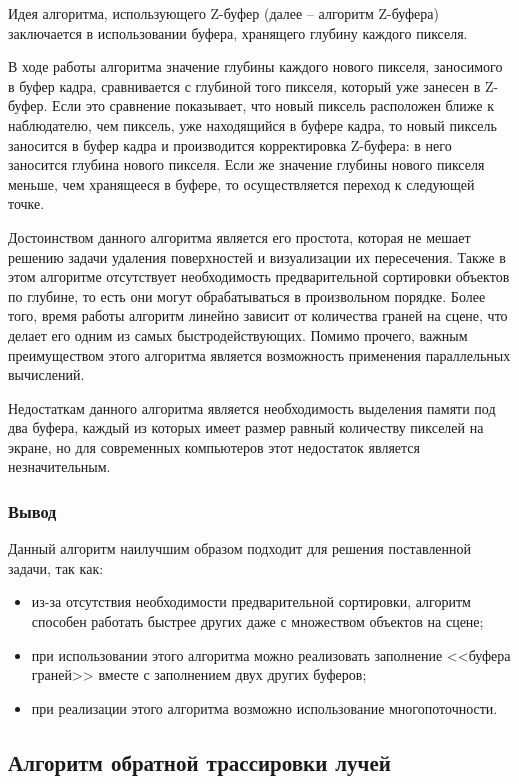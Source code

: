Идея алгоритма, использующего Z-буфер (далее -- алгоритм Z-буфера) заключается в использовании буфера, хранящего глубину каждого пикселя.

В ходе работы алгоритма значение глубины каждого нового пикселя, заносимого в буфер кадра, сравнивается с глубиной того пикселя, который уже занесен в Z-буфер. Если это сравнение показывает, что новый пиксель расположен ближе к наблюдателю, чем пиксель, уже находящийся в буфере кадра, то новый пиксель заносится в буфер кадра и производится корректировка Z-буфера: в него заносится глубина нового пикселя. Если же значение глубины нового пикселя меньше, чем хранящееся в буфере, то осуществляется переход к следующей точке.

Достоинством данного алгоритма является его простота, которая не мешает решению задачи удаления поверхностей и визуализации их пересечения. Также в этом алгоритме отсутствует необходимость предварительной сортировки объектов по глубине, то есть они могут обрабатываться в произвольном порядке. Более того, время работы алгоритм линейно зависит от количества граней на сцене, что делает его одним из самых быстродействующих. Помимо прочего, важным преимуществом этого алгоритма является возможность применения параллельных вычислений.

Недостаткам данного алгоритма является необходимость выделения памяти под два буфера, каждый из которых имеет размер равный количеству пикселей на экране, но для современных компьютеров этот недостаток является незначительным.

\subsubsection*{Вывод}

Данный алгоритм наилучшим образом подходит для решения поставленной задачи, так как:

\begin{itemize}[label=---]
	\item из-за отсутствия необходимости предварительной сортировки, алгоритм способен работать быстрее других даже с множеством объектов на сцене;
	\item при использовании этого алгоритма можно реализовать заполнение <<буфера граней>> вместе с заполнением двух других буферов;
	\item при реализации этого алгоритма возможно использование многопоточности.
\end{itemize}

\subsection{Алгоритм обратной трассировки лучей}

